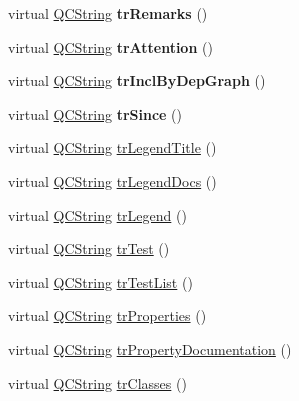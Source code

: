 \begin{DoxyCompactItemize}
virtual \mbox{\hyperlink{class_q_c_string}{Q\+C\+String}} {\bfseries tr\+Remarks} ()
\item 
\mbox{\label{class_translator_italian_aa456367941b59da84d45263efc8ab36e}} 
virtual \mbox{\hyperlink{class_q_c_string}{Q\+C\+String}} {\bfseries tr\+Attention} ()
\item 
\mbox{\label{class_translator_italian_a9c0d52579816c8c7e60e06a80ea65e4a}} 
virtual \mbox{\hyperlink{class_q_c_string}{Q\+C\+String}} {\bfseries tr\+Incl\+By\+Dep\+Graph} ()
\item 
\mbox{\label{class_translator_italian_a1f0d3f2d70aa1f0084f1913b052745de}} 
virtual \mbox{\hyperlink{class_q_c_string}{Q\+C\+String}} {\bfseries tr\+Since} ()
\item 
virtual \mbox{\hyperlink{class_q_c_string}{Q\+C\+String}} \mbox{\hyperlink{class_translator_italian_a67cd869f445d313c0c00e8780c48bf82}{tr\+Legend\+Title}} ()
\item 
virtual \mbox{\hyperlink{class_q_c_string}{Q\+C\+String}} \mbox{\hyperlink{class_translator_italian_a5ce89ace96901e814979cd3432febfb8}{tr\+Legend\+Docs}} ()
\item 
virtual \mbox{\hyperlink{class_q_c_string}{Q\+C\+String}} \mbox{\hyperlink{class_translator_italian_aee7be174220a1e00c4d2e42e240baf3b}{tr\+Legend}} ()
\item 
virtual \mbox{\hyperlink{class_q_c_string}{Q\+C\+String}} \mbox{\hyperlink{class_translator_italian_a48ede639c7999aefde7f2c8795b0c4ee}{tr\+Test}} ()
\item 
virtual \mbox{\hyperlink{class_q_c_string}{Q\+C\+String}} \mbox{\hyperlink{class_translator_italian_aa5159c060ab25815dd0a582a9d89652c}{tr\+Test\+List}} ()
\item 
virtual \mbox{\hyperlink{class_q_c_string}{Q\+C\+String}} \mbox{\hyperlink{class_translator_italian_a06e1f80be0ac99de301d5814e561d0ad}{tr\+Properties}} ()
\item 
virtual \mbox{\hyperlink{class_q_c_string}{Q\+C\+String}} \mbox{\hyperlink{class_translator_italian_af7c9d139eb6997eb44d83f0caafbdb87}{tr\+Property\+Documentation}} ()
\item 
virtual \mbox{\hyperlink{class_q_c_string}{Q\+C\+String}} \mbox{\hyperlink{class_translator_italian_ac669dab3bfdde9cf9c0a662917d3e46b}{tr\+Classes}} ()
\item 

\end{DoxyCompactItemize}
